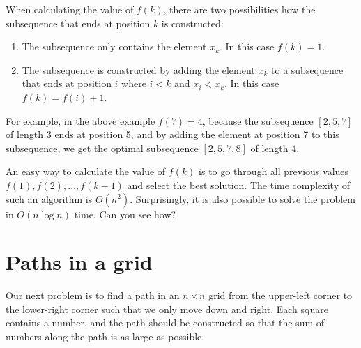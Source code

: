 When calculating the value of $f(k)$,
there are two possibilities how the subsequence
that ends at position $k$ is constructed:
\begin{enumerate}
\item The subsequence
only contains the element $x_k$. In this case $f(k)=1$.
\item The subsequence is constructed
by adding the element $x_k$ to
a subsequence that ends at position $i$
where $i<k$ and $x_i<x_k$. In this case $f(k)=f(i)+1$.
\end{enumerate}

For example, in the above example $f(7)=4$,
because the subsequence $[2,5,7]$ of length 3
ends at position 5, and by adding the element
at position 7 to this subsequence,
we get the optimal subsequence $[2,5,7,8]$ of length 4.

An easy way to calculate the
value of $f(k)$ is to
go through all previous values
$f(1),f(2),\ldots,f(k-1)$ and select the best solution.
The time complexity of such an algorithm is $O(n^2)$.
Surprisingly, it is also possible to solve the
problem in $O(n \log n)$ time. Can you see how?

\section{Paths in a grid}

Our next problem is to find a path
in an $n \times n$ grid
from the upper-left corner to
the lower-right corner such that
we only move down and right.
Each square contains a number,
and the path should be constructed so
that the sum of numbers along
the path is as large as possible.

